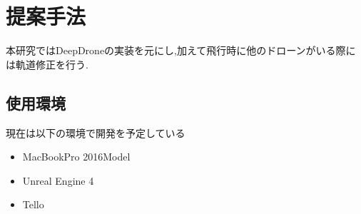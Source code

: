 \section{提案手法}
本研究ではDeepDrone\cite{DeepDrone}の実装を元にし,加えて飛行時に他のドローンがいる際には軌道修正を行う.


\subsection{使用環境}
現在は以下の環境で開発を予定している
\begin{itemize}
\item MacBookPro 2016Model
\item Unreal Engine 4
\item Tello
\end{itemize}
